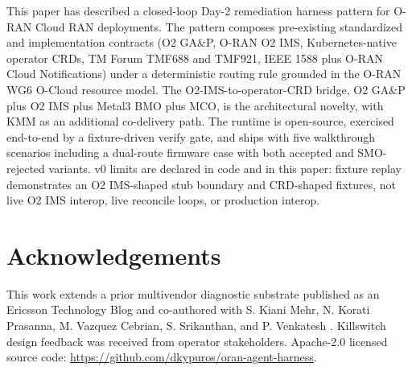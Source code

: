 \documentclass[twocolumn,10pt,a4paper]{article}
\begin{document}
This paper has described a closed-loop Day-2 remediation harness pattern for O-RAN Cloud RAN deployments. The pattern composes pre-existing standardized and implementation contracts (O2 GA\&P, O-RAN O2 IMS, Kubernetes-native operator CRDs, TM Forum TMF688 and TMF921, IEEE 1588 plus O-RAN Cloud Notifications) under a deterministic routing rule grounded in the O-RAN WG6 O-Cloud resource model. The O2-IMS-to-operator-CRD bridge, O2 GA\&P plus O2 IMS plus Metal3 BMO plus MCO, is the architectural novelty, with KMM as an additional co-delivery path. The runtime is open-source, exercised end-to-end by a fixture-driven verify gate, and ships with five walkthrough scenarios including a dual-route firmware case with both accepted and SMO-rejected variants. v0 limits are declared in code and in this paper: fixture replay demonstrates an O2 IMS-shaped stub boundary and CRD-shaped fixtures, not live O2 IMS interop, live reconcile loops, or production interop.

\section*{Acknowledgements}

This work extends a prior multivendor diagnostic substrate published as an Ericsson Technology Blog and co-authored with S. Kiani Mehr, N. Korati Prasanna, M. Vazquez Cebrian, S. Srikanthan, and P. Venkatesh \cite{multivendor_blog_2026}. Killswitch design feedback was received from operator stakeholders. Apache-2.0 licensed source code: \url{https://github.com/dkypuros/oran-agent-harness}.



\end{document}
